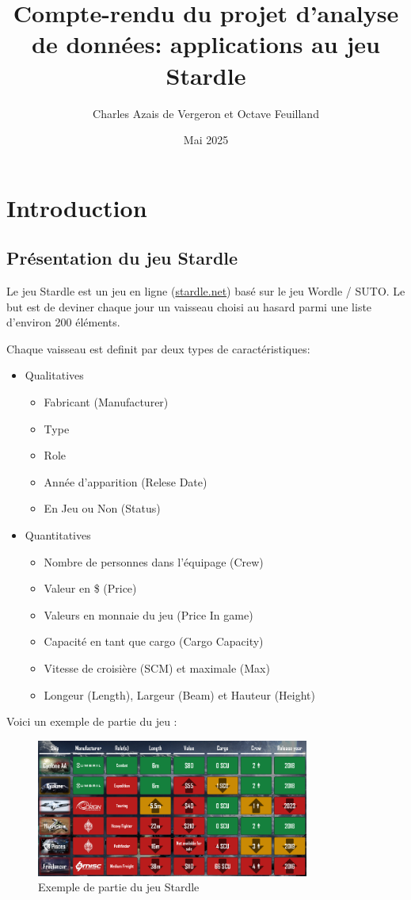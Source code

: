 \documentclass{article}
\title{Compte-rendu du projet d'analyse de données: applications au jeu Stardle}
\author{Charles Azais de Vergeron et Octave Feuilland }
\date{Mai 2025}
\begin{document}
\maketitle

\section{Introduction}
\subsection{Présentation du jeu Stardle}

Le jeu Stardle est un jeu en ligne (\href{https://stardle.net}{stardle.net}) basé sur le jeu Wordle / SUTO. 
Le but est de deviner chaque jour un vaisseau choisi au hasard parmi une liste d'environ 200 éléments.

Chaque vaisseau est definit par deux types de caractéristiques: 
\begin{itemize}
    \item Qualitatives
    \begin{itemize}
        \item Fabricant (Manufacturer)
        \item Type
        \item Role 
        \item Année d'apparition (Relese Date)
        \item En Jeu ou Non (Status)
    \end{itemize}
    \item Quantitatives
    \begin{itemize}
        \item Nombre de personnes dans l'équipage (Crew)
        \item Valeur en \$ (Price)
        \item Valeurs en monnaie du jeu (Price In game)
        \item Capacité en tant que cargo (Cargo Capacity)
        \item Vitesse de croisière (SCM) et maximale (Max)
        \item Longeur (Length), Largeur (Beam) et Hauteur (Height)
    \end{itemize}
\end{itemize}

Voici un exemple de partie du jeu : \\

\begin{figure}[h]
    \centering
    \includegraphics[width=0.8\textwidth]{stardle.png}
    \caption{Exemple de partie du jeu Stardle}
    \label{fig:stardle}
\end{figure}
\end{document}
